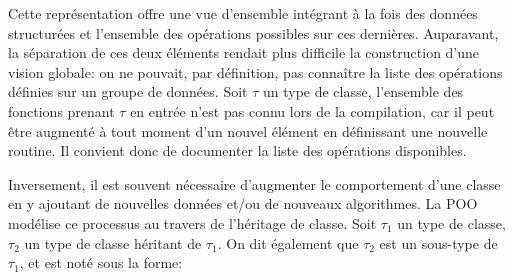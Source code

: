 Cette représentation offre une vue d'ensemble intégrant à la fois des
données structurées et l'ensemble des opérations possibles sur ces
dernières. Auparavant, la séparation de ces deux éléments rendait plus
difficile la construction d'une vision globale: on ne pouvait, par
définition, pas connaître la liste des opérations définies sur un
groupe de données. Soit $\tau$ un type de classe, l'ensemble des
fonctions prenant $\tau$ en entrée n'est pas connu lors de la
compilation, car il peut être augmenté à tout moment d'un nouvel
élément en définissant une nouvelle routine. Il convient donc de
documenter la liste des opérations disponibles.

Inversement, il est souvent nécessaire d'augmenter le comportement
d'une classe en y ajoutant de nouvelles données et/ou de nouveaux
algorithmes. La POO modélise ce processus au travers de l'héritage de
classe. Soit $\tau_1$ un type de classe, $\tau_2$ un type de classe
héritant de $\tau_1$. On dit également que $\tau_2$ est un sous-type
de $\tau_1$, et est noté sous la forme:

